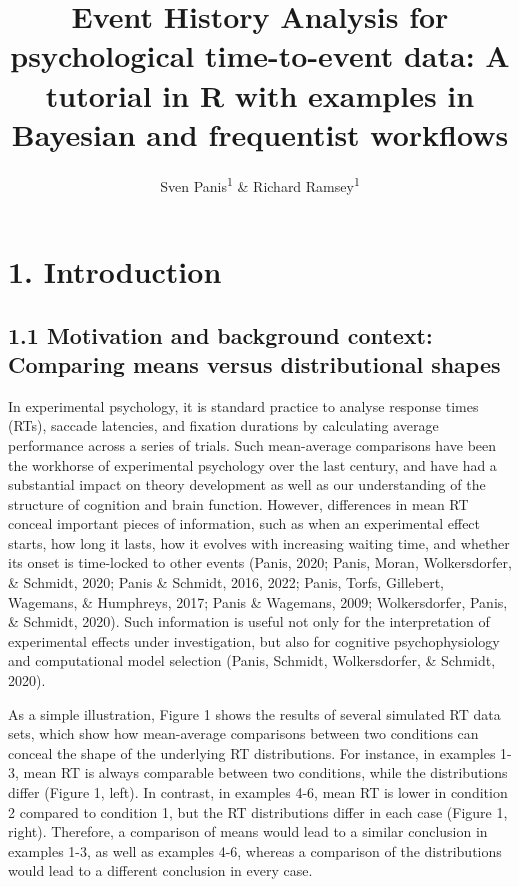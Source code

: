 \documentclass[
  man, donotrepeattitle,floatsintext]{apa6}
\title{Event History Analysis for psychological time-to-event data: A tutorial in R with examples in Bayesian and frequentist workflows}
\author{Sven Panis\textsuperscript{1} \& Richard Ramsey\textsuperscript{1}}
\date{}
\affiliation{\vspace{0.5cm}\textsuperscript{1} ETH Zürich}
\begin{document}
\maketitle

\section{1. Introduction}\label{introduction}

\subsection{1.1 Motivation and background context: Comparing means versus distributional shapes}\label{motivation-and-background-context-comparing-means-versus-distributional-shapes}

In experimental psychology, it is standard practice to analyse response times (RTs), saccade latencies, and fixation durations by calculating average performance across a series of trials. Such mean-average comparisons have been the workhorse of experimental psychology over the last century, and have had a substantial impact on theory development as well as our understanding of the structure of cognition and brain function. However, differences in mean RT conceal important pieces of information, such as when an experimental effect starts, how long it lasts, how it evolves with increasing waiting time, and whether its onset is time-locked to other events (Panis, 2020; Panis, Moran, Wolkersdorfer, \& Schmidt, 2020; Panis \& Schmidt, 2016, 2022; Panis, Torfs, Gillebert, Wagemans, \& Humphreys, 2017; Panis \& Wagemans, 2009; Wolkersdorfer, Panis, \& Schmidt, 2020). Such information is useful not only for the interpretation of experimental effects under investigation, but also for cognitive psychophysiology and computational model selection (Panis, Schmidt, Wolkersdorfer, \& Schmidt, 2020).

As a simple illustration, Figure 1 shows the results of several simulated RT data sets, which show how mean-average comparisons between two conditions can conceal the shape of the underlying RT distributions. For instance, in examples 1-3, mean RT is always comparable between two conditions, while the distributions differ (Figure 1, left). In contrast, in examples 4-6, mean RT is lower in condition 2 compared to condition 1, but the RT distributions differ in each case (Figure 1, right). Therefore, a comparison of means would lead to a similar conclusion in examples 1-3, as well as examples 4-6, whereas a comparison of the distributions would lead to a different conclusion in every case.
\end{document}
